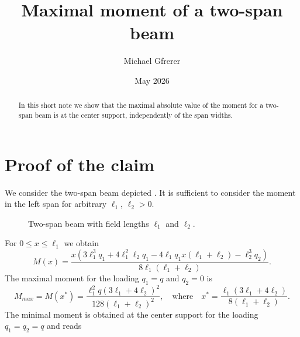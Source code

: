 \documentclass[a4paper]{article}
\title{Maximal moment of a two-span beam}
\author{Michael Gfrerer}
\date{May 2026}
\begin{document}
\maketitle
\begin{abstract}
    In this short note we show that the maximal absolute value of the moment for a two-span beam is at the center support, independently of the span widths.
\end{abstract}
\section*{Proof of the claim}
We consider the two-span beam depicted . It is sufficient to consider the moment in the left span for arbitrary $\ell_1$, $\ell_2 > 0$. 
\begin{figure}[H]
    \centering
    \caption{Two-span beam with field lengths $\ell_1$ and $\ell_2$.}
    \label{fig:beam}
\end{figure}
For $0\le x\le \ell_1$ we obtain
\begin{equation}
    M(x) = \frac{x \left(3 \ell_{1}^{3} q_{1} + 4 \ell_{1}^{2} \ell_{2} q_{1} - 4 \ell_{1} q_{1} x \left(\ell_{1} + \ell_{2}\right) - \ell_{2}^{3} q_{2}\right)}{8 \ell_{1} \left(\ell_{1} + \ell_{2}\right)}.
\end{equation}
The maximal moment for the loading $q_1=q$ and $q_2=0$ is 
\begin{equation}
    M_{max}=M(x^*) = \frac{\ell_{1}^{2} q \left(3 \ell_{1} + 4 \ell_{2}\right)^{2}}{128 \left(\ell_{1} + \ell_{2}\right)^{2}}, \quad \text{where}\quad x^*=\frac{\ell_{1} \left(3 \ell_{1} + 4 \ell_{2}\right)}{8 \left(\ell_{1} + \ell_{2}\right)}.
\end{equation}
The minimal moment is obtained at the center support for the loading $q_1=q_2=q$ and reads
\end{document}
